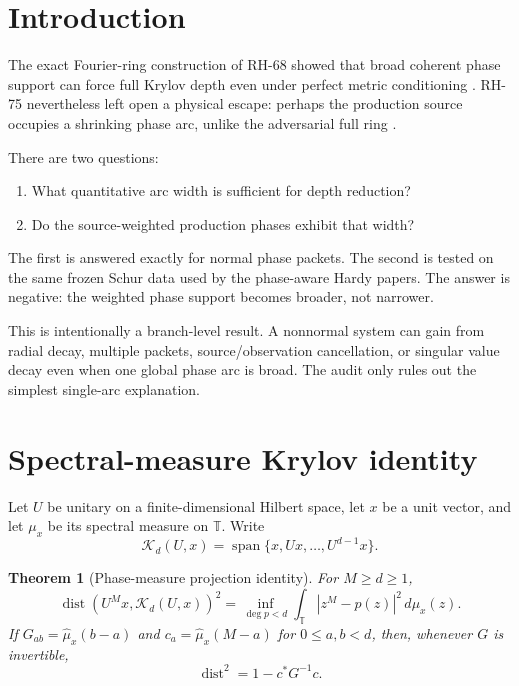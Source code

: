 \documentclass[11pt]{article}
\newtheorem{theorem}{Theorem}[section]
\newcommand{\K}{\mathcal K}
\begin{document}
\section{Introduction}

The exact Fourier-ring construction of RH-68 showed that broad coherent phase
support can force full Krylov depth even under perfect metric conditioning
\citep{WangBarrier2026}.  RH-75 nevertheless left open a physical escape:
perhaps the production source occupies a shrinking phase arc, unlike the
adversarial full ring \citep{WangScaling2026}.

There are two questions:
\begin{enumerate}[leftmargin=2.2em]
 \item What quantitative arc width is sufficient for depth reduction?
 \item Do the source-weighted production phases exhibit that width?
\end{enumerate}
The first is answered exactly for normal phase packets.  The second is tested
on the same frozen Schur data used by the phase-aware Hardy papers.  The answer
is negative: the weighted phase support becomes broader, not narrower.

This is intentionally a branch-level result.  A nonnormal system can gain from
radial decay, multiple packets, source/observation cancellation, or singular
value decay even when one global phase arc is broad.  The audit only rules out
the simplest single-arc explanation.

\section{Spectral-measure Krylov identity}

Let $U$ be unitary on a finite-dimensional Hilbert space, let $x$ be a unit
vector, and let $\mu_x$ be its spectral measure on $\mathbb T$.  Write
\[
 \K_d(U,x)=\operatorname{span}\{x,Ux,\ldots,U^{d-1}x\}.
\]

\begin{theorem}[Phase-measure projection identity]
\label{thm:identity}
For $M\ge d\ge1$,
\begin{equation}
 \operatorname{dist}(U^Mx,\K_d(U,x))^2
 =\inf_{\deg p<d}\int_{\mathbb T}|z^M-p(z)|^2\,d\mu_x(z).
 \label{eq:identity}
\end{equation}
If $G_{ab}=\widehat\mu_x(b-a)$ and
$c_a=\widehat\mu_x(M-a)$ for $0\le a,b<d$, then, whenever $G$ is invertible,
\begin{equation}
 \operatorname{dist}^2=1-c^*G^{-1}c.
 \label{eq:schur}
\end{equation}
\end{theorem}
\end{document}

